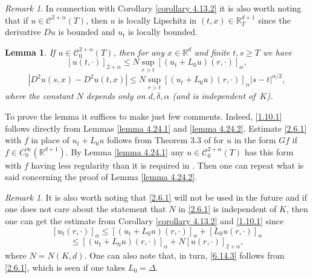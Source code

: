 \documentclass[reqno,12pt]{amsart}
\newtheorem{lemma}[theorem]{Lemma}
\theoremstyle{definition}
\theoremstyle{remark}
\newtheorem{remark}[theorem]{Remark}
\begin{document}
\begin{remark}
                                              \label{remark do}
   In connection with  Corollary \ref{corollary 4.13.2}
   it is also worth
noting that  if $u\in{\mathcal{C}}^{2+\alpha}(T)$, then $u$ is locally
Lipschitz in $(t,x)\in{\mathbb{R}}^{d+1}_{T}$ since the derivative
   $D u$  is bounded and $u_{t}$ is locally bounded.
\end{remark}

\begin{lemma}
                                        \label{lemma 2.6.1}
If $u\in{\mathcal{C}}^{2+\alpha}_{0}(T)$, then for any $x\in{\mathbb{R}}^{d}$ and
finite $t,s\ge  T$   we have
\begin{equation}
                                                  \label{1.10.1}
[u(t,\cdot)]_{ 2+\alpha}\leq N \sup_{r > t}[(u_{t}+
L_{0}u)(r,\cdot)]_{\alpha},
\end{equation}
\begin{equation}
                                                  \label{2.6.1}
|D^{2}u(s,x)-D^{2}u(t,x)|\leq N  \sup_{r > t}[(u_{t}+
L_{0}u)(r,\cdot)]_{\alpha}|s-t|^{\alpha/2},
\end{equation}
where the constant $N$ depends only on $d,\delta,\alpha$ (and is
independent of~$K$).
\end{lemma}
    To prove the lemma it suffices to make
just few comments. Indeed, \eqref{1.10.1} follows directly from
Lemmas \ref{lemma 4.24.1} and \ref{lemma 4.24.2}. Estimate
\eqref{2.6.1} with $f$ in place of $u_{t}+L_{0}u$ follows from
Theorem 3.3 of \cite{Kry2} for $u$ in the form $Gf$ if $f\in
C^{\infty}_{0} ({\mathbb{R}}^{d+1})  $. By Lemma \ref{lemma 4.24.1} any   $
u \in {\mathcal{C}}^{2+\alpha}_{0}(T)$  has this form with $f$ having less
regularity than it is required in \cite{Kry2}.
   Then one can repeat what is said concerning the proof of
   Lemma \ref{lemma 4.24.2}.

\begin{remark}
It is also worth noting that \eqref{2.6.1} will not be used in the
future and if one does not care about the statement that $N$ in
\eqref{2.6.1} is independent of $K$, then one can get the estimate
from   Corollary \ref{corollary 4.13.2} and \eqref {1.10.1} since
$$
[u_{t}(r,\cdot)]_{\alpha}\leq [(u_{t}+ L_{0}u)(r,\cdot)]_{\alpha}+
[ L_{0}u (r,\cdot)]_{\alpha}
$$
$$
\leq [(u_{t}+ L_{0}u)(r,\cdot)]_{\alpha}+ N
[u(r,\cdot)]_{2+\alpha},
$$
   where $N =N (K, d)$.
   One can also note that, in turn, \eqref{6.14.3}
follows from \eqref{2.6.1}, which is seen if one takes
$L_{0}=\Delta$.
\end{remark}
\end{document}
